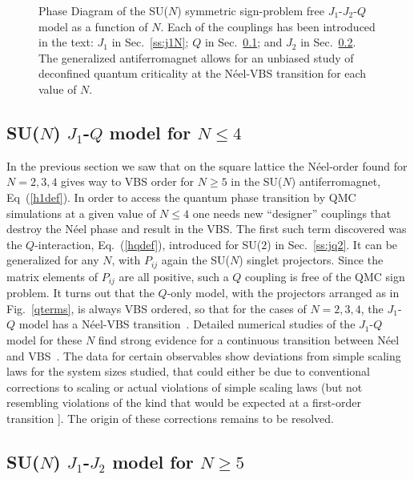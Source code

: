 \documentclass[range]{ar2e}
\begin{document}
\begin{figure}
\centerline{}
  \caption{ \label{fig:pdj1j2q} Phase Diagram of the
    SU($N$) symmetric sign-problem free
    $J_1$-$J_2$-$Q$ model as a function of $N$. Each of the couplings has been introduced
    in the text: $J_1$ in Sec.~\ref{ss:j1N}; $Q$ in Sec.~\ref{ss:jqN};
  and $J_2$ in Sec.~\ref{ss:j1j2N}. The generalized antiferromagnet
  allows for an unbiased study of deconfined quantum
  criticality at the N\'eel-VBS transition for each value of $N$. }
\end{figure}


\subsection{SU($N$) $J_1$-$Q$ model for $N\leq 4$}
\label{ss:jqN}
In the previous section we saw that on the square lattice the N\'eel-order found for $N=2,3,4$ gives way to VBS
order for $N\geq 5$ in the SU($N$) antiferromagnet, Eq~(\ref{h1def}). In order to access the quantum phase transition by QMC simulations at a 
given value of $N\leq 4$ one needs new ``designer'' couplings that destroy the N\'eel phase and result in the VBS. The first such term discovered 
was the $Q$-interaction, Eq.~(\ref{hqdef}), introduced for SU($2$) in Sec.~\ref{ss:jq2}. It can be generalized for any $N$, with $P_{ij}$ again 
the SU($N$) singlet projectors. Since the matrix elements of $P_{ij}$ are all positive, such a $Q$ coupling is free of the QMC sign problem. 
It turns out that the $Q$-only model, with the projectors arranged as in Fig.~\ref{qterms}, is always VBS ordered, so that for the cases of $N=2,3,4$, 
the $J_1$-$Q$ model has a N\'eel-VBS transition~\cite{Sandvik07,lou2009:sun}. Detailed numerical studies of the $J_1$-$Q$ model for these $N$ find strong 
evidence for a continuous transition between N\'eel and VBS~\cite{melko2008:jq,kaul2011:su34,banerjee2010:log,banerjee2010:su3}. The data for certain 
observables show deviations from simple scaling laws for the system sizes studied, that could either be due to conventional corrections to scaling or 
actual violations of simple scaling laws (but not resembling violations of the kind that would be expected at a first-order transition \cite{Sandvik10c}]. 
The origin of these corrections remains to be resolved.

\subsection{SU($N$) $J_1$-$J_2$ model for $N\geq 5$}
\label{ss:j1j2N}
\end{document}
